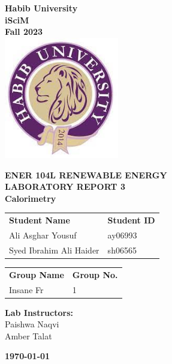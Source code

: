 \documentclass[a4paper, 12pt, english]{article}
\begin{document}
\begin{titlepage}
	\begin{center}
		\textbf{\LARGE Habib University}\\[0.5cm]
		\textbf{\large iSciM}\\[0.2cm]
		\textbf {\large Fall 2023}\\[0.2cm]
		\vspace{20pt}
		\includegraphics[width=5cm]{../habiblogo.jpg}\\[1cm]
		\par
		\vspace{20pt}
		\textbf{\Large ENER 104L RENEWABLE ENERGY}\\
		\vspace{15pt}
		\myrule[1pt][7pt]
		\textbf{\LARGE  LABORATORY REPORT 3}\\
		\vspace{15pt}
		\textbf{\large Calorimetry}\\
		\myrule[1pt][7pt]
		\vspace{25pt}
		\begin{tabular}{@{}p{5cm}p{3cm}@{}}
			\textbf{\large Student Name} & \textbf{\large Student ID} \\
			Ali Asghar Yousuf            & ay06993                    \\ %
			Syed Ibrahim Ali Haider      & sh06565                    \\ %
		\end{tabular}

		\vspace{10pt}
		\begin{tabular}{@{}p{5cm}p{3cm}@{}}
			\textbf{\large Group Name} & \textbf{\large Group No.} \\
			Insane Fr                  & 1                         \\
		\end{tabular}

		\vspace{45pt}
		\textbf {\large Lab Instructors:}\\[0.2cm]
		\Large {Paishwa Naqvi}\\[0.1cm]
		\Large {Amber Talat}\\[0.1cm]
	\end{center}

	\par
	\vfill
	\begin{center}
		\textbf{\today}\\
	\end{center}

\end{titlepage}
\end{document}
